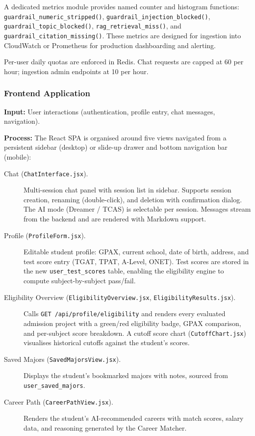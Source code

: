 ﻿\documentclass[12pt,a4paper]{article}
\begin{document}
A dedicated metrics module provides named counter and histogram functions:
\texttt{guardrail\_numeric\_stripped()},
\texttt{guardrail\_injection\_blocked()},
\texttt{guardrail\_topic\_blocked()},
\texttt{rag\_retrieval\_miss()}, and
\texttt{guardrail\_citation\_missing()}.
These metrics are designed for ingestion into CloudWatch or Prometheus for
production dashboarding and alerting.

Per-user daily quotas are enforced in Redis. Chat requests are capped at 60 per
hour; ingestion admin endpoints at 10 per hour.

\subsubsection{Frontend Application}

\textbf{Input:} User interactions (authentication, profile entry, chat messages,
navigation).

\textbf{Process:} The React SPA is organised around five views navigated from a
persistent sidebar (desktop) or slide-up drawer and bottom navigation bar (mobile):

\begin{description}
    \item[Chat (\texttt{ChatInterface.jsx}).] Multi-session chat panel with
    session list in sidebar. Supports session creation, renaming (double-click),
    and deletion with confirmation dialog. The AI mode (Dreamer / TCAS) is
    selectable per session. Messages stream from the backend and are rendered with
    Markdown support.

    \item[Profile (\texttt{ProfileForm.jsx}).] Editable student profile: GPAX,
    current school, date of birth, address, and test score entry (TGAT, TPAT,
    A-Level, ONET). Test scores are stored in the new \texttt{user\_test\_scores}
    table, enabling the eligibility engine to compute subject-by-subject pass/fail.

    \item[Eligibility Overview (\texttt{EligibilityOverview.jsx}, \texttt{EligibilityResults.jsx}).] Calls
    \texttt{GET /api/profile/eligibility} and renders every evaluated admission
    project with a green/red eligibility badge, GPAX comparison, and per-subject
    score breakdown. A cutoff score chart (\texttt{CutoffChart.jsx}) visualises
    historical cutoffs against the student's scores.

    \item[Saved Majors (\texttt{SavedMajorsView.jsx}).] Displays the student's
    bookmarked majors with notes, sourced from \texttt{user\_saved\_majors}.

    \item[Career Path (\texttt{CareerPathView.jsx}).] Renders the student's
    AI-recommended careers with match scores, salary data, and reasoning generated
    by the Career Matcher.
\end{description}
\end{document}
